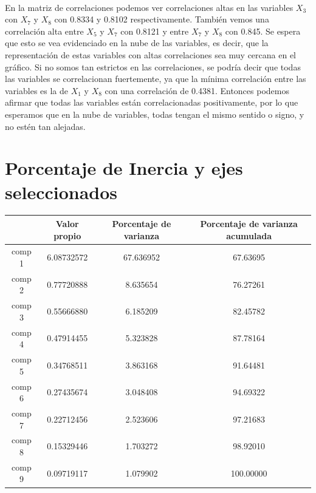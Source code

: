 \documentclass[report,oneside]{revcoles}
\begin{document}
~\\En la matriz de correlaciones podemos ver correlaciones altas en las variables $X_3$ con $X_7$ y $X_8$ con 0.8334 y 0.8102 respectivamente. También vemos una correlación alta entre $X_5$ y $X_7$ con 0.8121 y entre $X_7$ y $X_8$ con 0.845. Se espera que esto se vea evidenciado en la nube de las variables, es decir, que la representación de estas variables con altas correlaciones sea muy cercana en el gráfico. Si no somos tan estrictos en las correlaciones, se podría decir que todas las variables se correlacionan fuertemente, ya que la mínima correlación entre las variables es la de $X_1$ y $X_8$ con una correlación de 0.4381. Entonces podemos afirmar que todas las variables están correlacionadas positivamente, por lo que esperamos que en la nube de variables, todas tengan el mismo sentido o signo, y no estén tan alejadas.

\section{Porcentaje de Inercia y ejes seleccionados}
\begin{center}
\begin{tabular}{|c|c|c|c|}
\hline 
 & Valor propio & Porcentaje de varianza & Porcentaje de varianza acumulada \\ 
\hline 
comp 1 & 6.08732572     &         67.636952&                          67.63695\\
comp 2 &0.77720888     &          8.635654  &                        76.27261\\
comp 3 &0.55666880    &           6.185209   &                       82.45782\\
comp 4 &0.47914455   &            5.323828    &                      87.78164\\
comp 5 &0.34768511  &             3.863168     &                     91.64481\\
comp 6 &0.27435674 &              3.048408      &                    94.69322\\
comp 7 &0.22712456&               2.523606       &                   97.21683\\
comp 8 &0.15329446&               1.703272        &                  98.92010\\
comp 9 &0.09719117&               1.079902         &                100.00000 \\
\hline 
\end{tabular} 
\end{center}
\end{document}
